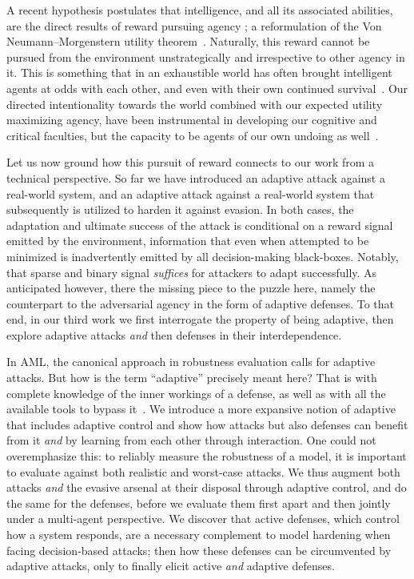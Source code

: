 A recent hypothesis postulates that intelligence, and all its associated abilities, are the direct results of reward pursuing agency \cite{silver2021reward}; a reformulation of the Von Neumann–Morgenstern utility theorem~\cite{von1947theory}.
Naturally, this reward cannot be pursued from the environment unstrategically and irrespective to other agency in it.
This is something that in an exhaustible world has often brought intelligent agents at odds with each other, and even with their own continued survival~\cite{tohme2019superrational}.
Our directed intentionality towards the world combined with our expected utility maximizing agency, have been instrumental in developing our cognitive and critical faculties, but the capacity to be agents of our own undoing as well~\cite{rlblogpost, skalse2022defining}.

Let us now ground how this pursuit of reward connects to our work from a technical perspective.
So far we have introduced an adaptive attack against a real-world system, and an adaptive attack against a real-world system that subsequently is utilized to harden it against evasion.
In both cases, the adaptation and ultimate success of the attack is conditional on a reward signal emitted by the environment, information that even when attempted to be minimized is inadvertently emitted by all decision-making black-boxes.
Notably, that sparse and binary signal \textit{suffices} for attackers to adapt successfully.
As anticipated however, there the missing piece to the puzzle here, namely the counterpart to the adversarial agency in the form of adaptive defenses.
To that end, in our third work we first interrogate the property of being adaptive, then explore adaptive attacks \textit{and} then defenses in their interdependence.

In \gls{AML}, the canonical approach in robustness evaluation calls for adaptive attacks.
But how is the term ``adaptive'' precisely meant here?
That is with complete knowledge of the inner workings of a defense, as well as with all the available tools to bypass it~\cite{tramer2020adaptive}.
We introduce a more expansive notion of adaptive that includes adaptive control \cite{aastrom2013adaptive} and show how attacks but also defenses can benefit from it \emph{and} by learning from each other through interaction.
One could not overemphasize this: to reliably measure the robustness of a model, it is important to evaluate against both realistic and worst-case attacks.
We thus augment both attacks \emph{and} the evasive arsenal at their disposal through adaptive control, and do the same for the defenses, before we evaluate them first apart and then jointly under a multi-agent perspective.
We discover that active defenses, which control how a system responds, are a necessary complement to model hardening when facing decision-based attacks; then how these defenses can be circumvented by adaptive attacks, only to finally elicit active \emph{and} adaptive defenses.

